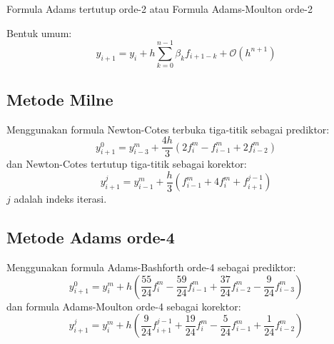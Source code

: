Formula Adams tertutup orde-2 atau
Formula Adams-Moulton orde-2

Bentuk umum:
\begin{equation*}
y_{i+1} = y_{i} + h \sum_{k=0}^{n-1} \beta_{k} f_{i+1-k} + \mathcal{O}(h^{n+1})
\end{equation*}


\subsection*{Metode Milne}

Menggunakan formula Newton-Cotes terbuka tiga-titik sebagai prediktor:
\begin{equation*}
y^{0}_{i+1} = y^{m}_{i-3} + \frac{4h}{3}\left(
2f^{m}_{i} - f^{m}_{i-1} + 2f^{m}_{i-2}
\right)
\end{equation*}
dan Newton-Cotes tertutup tiga-titik sebagai korektor:
\begin{equation*}
y^{j}_{i+1} = y^{m}_{i-1} + \frac{h}{3} \left(
f^{m}_{i-1} + 4f^{m}_{i} + f^{j-1}_{i+1}
\right)
\end{equation*}
$j$ adalah indeks iterasi.

\subsection*{Metode Adams orde-4}

Menggunakan formula Adams-Bashforth orde-4 sebagai prediktor:
\begin{equation*}
y^{0}_{i+1} = y^{m}_{i} + h \left(
\frac{55}{24} f^{m}_{i} - \frac{59}{24}f^{m}_{i-1} + \frac{37}{24}f^{m}_{i-2}
- \frac{9}{24} f^{m}_{i-3}
\right)
\end{equation*}
dan formula Adams-Moulton orde-4 sebagai korektor:
\begin{equation*}
y^{j}_{i+1} = y^{m}_{i} + h \left( 
\frac{9}{24} f^{j-1}_{i+1} + \frac{19}{24} f^{m}_{i} - \frac{5}{24} f^{m}_{i-1}
+ \frac{1}{24} f^{m}_{i-2}
\right)
\end{equation*}


